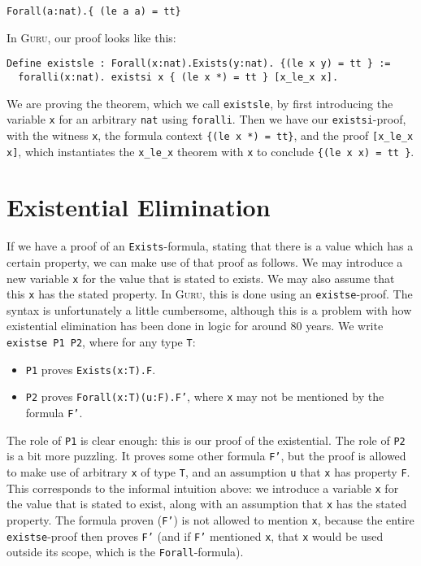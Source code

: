 \documentclass{book}[12pt]
\newcommand{\guru}[0]{\textsc{Guru}\xspace}
\begin{document}
\begin{verbatim}
Forall(a:nat).{ (le a a) = tt}
\end{verbatim}

In \guru, our proof looks like this:

\begin{verbatim}
Define existsle : Forall(x:nat).Exists(y:nat). {(le x y) = tt } :=
  foralli(x:nat). existsi x { (le x *) = tt } [x_le_x x].
\end{verbatim}

\noindent We are proving the theorem, which we call \texttt{existsle},
by first introducing the variable \texttt{x} for an arbitrary
\texttt{nat} using \texttt{foralli}.  Then we have our
\texttt{existsi}-proof, with the witness \texttt{x}, the formula
context \texttt{\{(le x *) = tt\}}, and the proof \texttt{[x\_le\_x x]},
which instantiates the \texttt{x\_le\_x} theorem with \texttt{x} to
conclude \texttt{\{(le x x) = tt \}}.

\section{Existential Elimination}
\label{ch5:existse}

If we have a proof of an \texttt{Exists}-formula, stating that there
is a value which has a certain property, we can make use of that proof
as follows.  We may introduce a new variable \texttt{x} for the value
that is stated to exists.  We may also assume that this \texttt{x} has
the stated property.  In \guru, this is done using an
\texttt{existse}-proof.  The syntax is unfortunately a little
cumbersome, although this is a problem with how existential
elimination has been done in logic for around 80 years.  We write
\texttt{existse P1 P2}, where for any type \texttt{T}:

\begin{itemize}
\item \texttt{P1} proves \texttt{Exists(x:T).F}.
\item \texttt{P2} proves \texttt{Forall(x:T)(u:F).F'}, where
\texttt{x} may not be mentioned by the formula \texttt{F'}.
\end{itemize}

\noindent The role of \texttt{P1} is clear enough: this is our proof
of the existential.  The role of \texttt{P2} is a bit more puzzling.
It proves some other formula \texttt{F'}, but the proof is allowed to
make use of arbitrary \texttt{x} of type \texttt{T}, and an assumption
\texttt{u} that \texttt{x} has property \texttt{F}.  This corresponds
to the informal intuition above: we introduce a variable \texttt{x}
for the value that is stated to exist, along with an assumption that
\texttt{x} has the stated property.  The formula proven (\texttt{F'})
is not allowed to mention \texttt{x}, because the entire
\texttt{existse}-proof then proves \texttt{F'} (and if \texttt{F'}
mentioned \texttt{x}, that \texttt{x} would be used outside its scope,
which is the \texttt{Forall}-formula).
\end{document}

